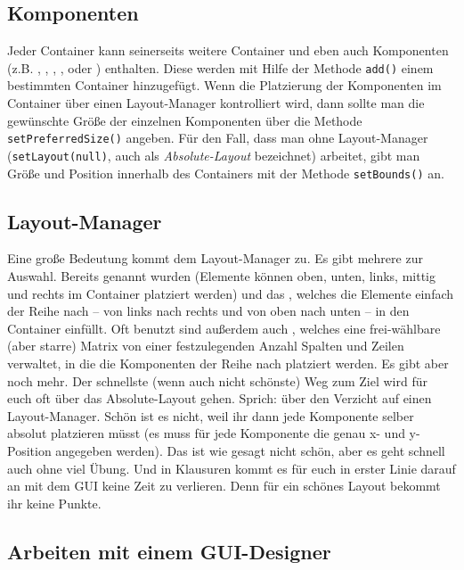 \subsection{Komponenten}

Jeder Container kann seinerseits weitere Container und eben auch Komponenten
(z.B. , , ,
,  oder ) enthalten.
Diese werden mit Hilfe der Methode \lstinline|add()| einem bestimmten Container
hinzugefügt. Wenn die Platzierung der Komponenten im Container über einen
Layout-Manager kontrolliert wird, dann sollte man die gewünschte Größe der
einzelnen Komponenten über die Methode \lstinline|setPreferredSize()| angeben.
Für den Fall, dass man ohne Layout-Manager (\lstinline|setLayout(null)|, auch
als \emph{Absolute-Layout} bezeichnet) arbeitet, gibt man Größe und Position
innerhalb des Containers mit der Methode \lstinline|setBounds()| an.

\subsection{Layout-Manager}

Eine große Bedeutung kommt dem Layout-Manager zu. Es gibt mehrere zur Auswahl.
Bereits genannt wurden  (Elemente können oben, unten,
links, mittig und rechts im Container platziert werden) und das
, welches die Elemente einfach der Reihe nach – von links
nach rechts und von oben nach unten – in den Container einfüllt. Oft benutzt
sind außerdem auch , welches eine frei-wählbare (aber
starre) Matrix von einer festzulegenden Anzahl Spalten und Zeilen verwaltet, in
die die Komponenten der Reihe nach platziert werden. Es gibt aber noch mehr.
Der schnellste (wenn auch nicht schönste) Weg zum Ziel wird für euch oft über
das Absolute-Layout gehen. Sprich: über den Verzicht auf einen Layout-Manager.
Schön ist es nicht, weil ihr dann jede Komponente selber absolut platzieren
müsst (es muss für jede Komponente die genau x- und y-Position angegeben
werden). Das ist wie gesagt nicht schön, aber es geht schnell auch ohne
viel Übung. Und in Klausuren kommt es für euch in erster Linie darauf an mit
dem GUI keine Zeit zu verlieren. Denn für ein schönes Layout bekommt ihr keine
Punkte.

\subsection{Arbeiten mit einem GUI-Designer}

